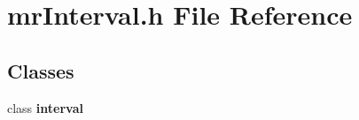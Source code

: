 \section{mr\-Interval.h File Reference}
\label{mrInterval_8h}
\subsection*{Classes}
\begin{CompactItemize}
\item 
class {\bf interval}
\end{CompactItemize}
